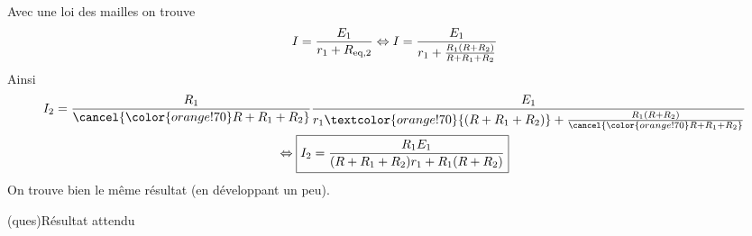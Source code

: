 \documentclass[../../main/main.tex]{subfiles}
\begin{document}
{\begin{tcb}
\begin{equation*}
    \end{equation*}
    \tcblower
    Avec une loi des mailles on trouve
    \begin{equation*}
        I                 = \frac{E_1}{r_1 + R_{\rm eq,2}}
        \Leftrightarrow I = \frac{E_1}{r_1 + \frac{R_1(R+R_2)}{R + R_1 + R_2}}
    \end{equation*}
    Ainsi
    \begin{gather*}
        I_2 = \frac{R_1}{\cancel{\color{orange!70}R + R_1 + R_2}}
            \frac{E_1}{r_1 \textcolor{orange!70}{(R+R_1+R_2)}
                    + \frac{R_1(R+R_2)}{\cancel{\color{orange!70}R + R_1 +
                R_2}}}\\
        \Leftrightarrow \boxed{I_2 = \frac{R_1E_1}{(R+R_1+R_2)r_1 + R_1(R+R_2)}}
    \end{gather*}
    On trouve bien le même résultat (en développant un peu).
\end{tcb}

\begin{tcbraster}[raster columns=2, raster equal height=rows]
    \begin{tcb}[](ques){Résultat attendu}

\end{tcb}
\end{tcbraster}}
\end{document}
